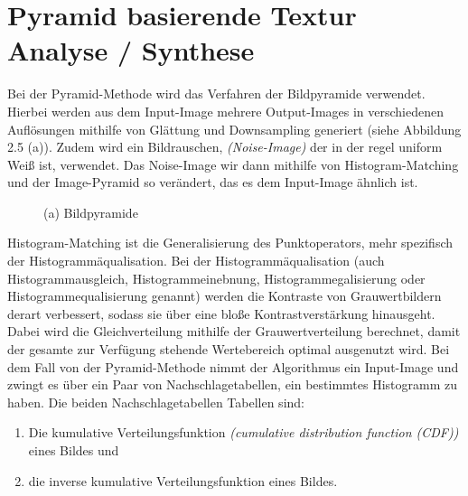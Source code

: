 \documentclass[12pt, a4paper,twoside,openright]{report}
\begin{document}
\section{Pyramid basierende Textur Analyse / Synthese}

Bei der Pyramid-Methode wird das Verfahren der Bildpyramide verwendet.
Hierbei werden aus dem Input-Image mehrere Output-Images in verschiedenen Auflösungen mithilfe von Glättung und Downsampling generiert {(siehe Abbildung 2.5 (a))}. \cite{Heeger}
\newline
Zudem wird ein Bildrauschen, \textit{(Noise-Image)} der in der regel uniform Weiß ist, verwendet.
Das Noise-Image wir dann mithilfe von Histogram-Matching und der Image-Pyramid so verändert, das es dem Input-Image ähnlich ist.

\begin{figure}[H]
    \centering
    \caption{(a) Bildpyramide}%
\end{figure}

Histogram-Matching ist die Generalisierung des Punktoperators, mehr spezifisch der Histogrammäqualisation.
Bei der Histogrammäqualisation {(auch Histogrammausgleich, Histogrammeinebnung, Histogrammegalisierung oder Histogrammequalisierung genannt)}
werden die Kontraste von Grauwertbildern derart verbessert, sodass sie über eine bloße Kontrastverstärkung hinausgeht.
Dabei wird die Gleichverteilung mithilfe der Grauwertverteilung berechnet, damit der gesamte zur Verfügung stehende Wertebereich optimal ausgenutzt wird. \cite{Lehmann2013}
Bei dem Fall von der Pyramid-Methode nimmt der Algorithmus ein Input-Image und zwingt es über ein Paar von Nachschlagetabellen, ein bestimmtes Histogramm zu haben.
Die beiden Nachschlagetabellen Tabellen sind:

\begin{enumerate}
    \item Die kumulative Verteilungsfunktion \textit{(cumulative distribution function (CDF))} eines Bildes und
    \item die inverse kumulative Verteilungsfunktion eines Bildes.
  \end{enumerate}
\end{document}
